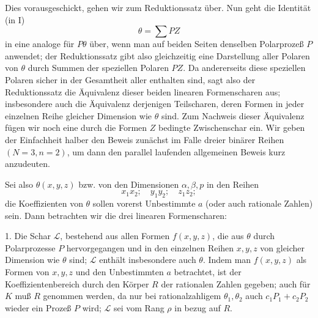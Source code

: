 \documentclass[11pt]{article}
\begin{document}
Dies vorausgeschickt, gehen wir zum Reduktionssatz über. Nun geht die Identität (in I)
\[
  \theta=\sum PZ
\]
in eine analoge für $P\theta$ über, wenn man auf beiden Seiten denselben Polarprozeß $P$ anwendet; der Reduktionssatz gibt also gleichzeitig eine Darstellung aller Polaren von $\theta$ durch Summen der speziellen Polaren $PZ$. Da andererseits diese speziellen Polaren sicher in der Gesamtheit aller enthalten sind, sagt also der Reduktionssatz die Äquivalenz dieser beiden linearen Formenscharen aus; insbesondere auch die Äquivalenz derjenigen Teilscharen, deren Formen in jeder einzelnen Reihe gleicher Dimension wie $\theta$ sind. Zum Nachweis dieser Äquivalenz fügen wir noch eine durch die Formen $Z$ bedingte Zwischenschar ein. Wir geben der Einfachheit halber den Beweis zunächst im Falle dreier binärer Reihen $(N=3,n=2)$, um dann den parallel laufenden allgemeinen Beweis kurz anzudeuten.

Sei also $\theta(x,y,z)$ bzw. von den Dimensionen $\alpha,\beta,p$ in den Reihen
\[
  x_1x_2;\quad y_1y_2;\quad z_1z_2;
\]
die Koeffizienten von $\theta$ sollen vorerst Unbestimmte $a$ (oder auch rationale Zahlen) sein. Dann betrachten wir die drei linearen Formenscharen:

1. Die Schar $\mathcal L$, bestehend aus allen Formen $f(x,y,z)$, die aus $\theta$ durch Polarprozesse $P$ hervorgegangen und in den einzelnen Reihen $x,y,z$ von gleicher Dimension wie $\theta$ sind; $\mathcal L$ enthält insbesondere auch $\theta$. Indem man $f(x,y,z)$ als Formen von $x,y,z$ und den Unbestimmten $a$ betrachtet, ist der Koeffizientenbereich durch den Körper $R$ der rationalen Zahlen gegeben; auch für $K$ muß $R$ genommen werden, da nur bei rationalzahligem $\theta_1,\theta_2$ auch $c_1P_1+c_2P_2$ wieder ein Prozeß $P$ wird; $\mathcal L$ sei vom Rang $\rho$ in bezug auf $R$.
\end{document}
